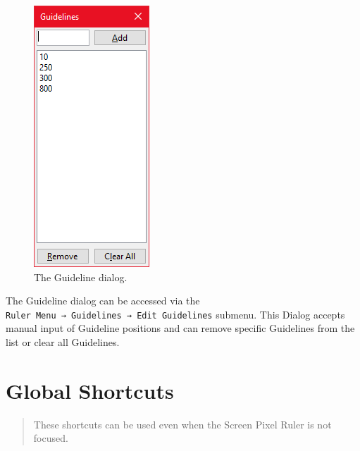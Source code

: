\documentclass[
]{book}
\begin{document}
\begin{figure}
\centering
\includegraphics{images/guideline-dialog.png}
\caption{\label{fig:unnamed-chunk-2}The Guideline dialog.}
\end{figure}

The Guideline dialog can be accessed via the \texttt{Ruler\ Menu\ →\ Guidelines\ →\ Edit\ Guidelines} submenu.
This Dialog accepts manual input of Guideline positions and can remove specific Guidelines from the list or clear all Guidelines.

\hypertarget{keyboard}{%
\chapter{Global Shortcuts}\label{keyboard}}

\begin{quote}
These shortcuts can be used even when the Screen Pixel Ruler is not focused.
\end{quote}
\end{document}
